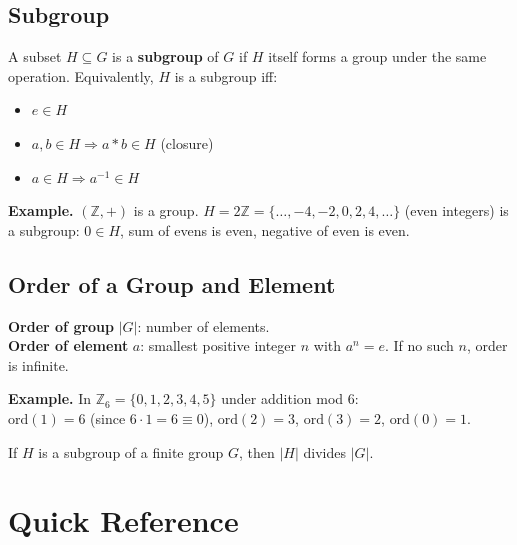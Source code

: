 \documentclass[12pt]{article}
\begin{document}
\subsection{Subgroup}

\begin{defbox}[Subgroup]
A subset $H \subseteq G$ is a \textbf{subgroup} of $G$ if $H$ itself forms a group under the same operation. Equivalently, $H$ is a subgroup iff:
\begin{itemize}[leftmargin=14pt]
  \item $e \in H$
  \item $a,b \in H \Rightarrow a*b \in H$ (closure)
  \item $a \in H \Rightarrow a^{-1} \in H$
\end{itemize}
\end{defbox}

\textbf{Example.} $(\mathbb{Z}, +)$ is a group. $H = 2\mathbb{Z} = \{\ldots,-4,-2,0,2,4,\ldots\}$ (even integers) is a subgroup: $0 \in H$, sum of evens is even, negative of even is even.

\subsection{Order of a Group and Element}

\begin{keybox}
\textbf{Order of group} $|G|$: number of elements.\\
\textbf{Order of element} $a$: smallest positive integer $n$ with $a^n = e$. If no such $n$, order is infinite.
\end{keybox}

\textbf{Example.} In $\mathbb{Z}_6 = \{0,1,2,3,4,5\}$ under addition mod 6:\\
$\text{ord}(1) = 6$ (since $6\cdot1=6\equiv0$), $\text{ord}(2)=3$, $\text{ord}(3)=2$, $\text{ord}(0)=1$.

\begin{thmbox}
If $H$ is a subgroup of a finite group $G$, then $|H|$ divides $|G|$.
\end{thmbox}

\section{Quick Reference}
\end{document}
